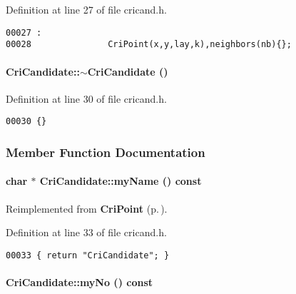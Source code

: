 Definition at line 27 of file cricand.h.\small\begin{verbatim}00027 :
00028               CriPoint(x,y,lay,k),neighbors(nb){};

\end{verbatim}\normalsize 
\label{CriCandidate_a1}
\paragraph{\setlength{\rightskip}{0pt plus 5cm}Cri\-Candidate::$\sim$Cri\-Candidate ()\hspace{0.3cm}{\tt  [inline]}}\hfill



Definition at line 30 of file cricand.h.\small\begin{verbatim}00030 {}
\end{verbatim}\normalsize 


\subsubsection{Member Function Documentation}
\label{CriCandidate_a3}
\paragraph{\setlength{\rightskip}{0pt plus 5cm}char $\ast$ Cri\-Candidate::my\-Name () const\hspace{0.3cm}{\tt  [inline, virtual]}}\hfill



Reimplemented from {\bf Cri\-Point} {\rm (p.\,\pageref{CriPoint_a4})}.

Definition at line 33 of file cricand.h.\small\begin{verbatim}00033 { return "CriCandidate"; }
\end{verbatim}\normalsize 
\label{CriCandidate_a2}
\paragraph{ Cri\-Candidate::my\-No () const\hspace{0.3cm}{\tt  [inline, virtual]}}\hfill




